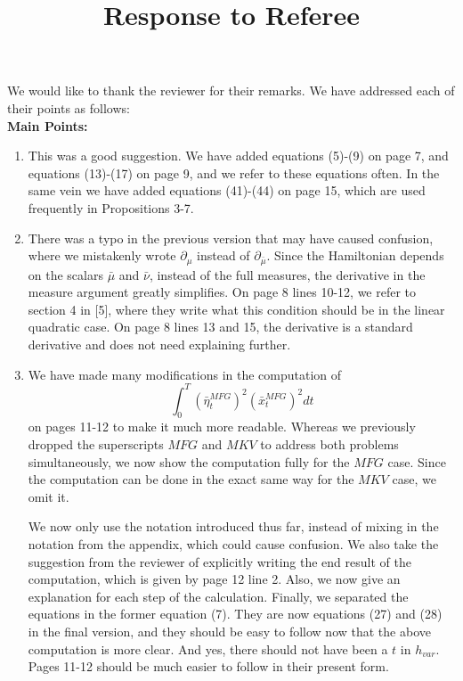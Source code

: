 \documentclass[11pt]{article}
\title{Response to Referee}
\author{}
\begin{document}
\maketitle

We would like to thank the reviewer for their remarks. We have addressed each of their points as follows:\\

\hspace{-7mm} \textbf{Main Points:}
\begin{enumerate}
	\item This was a good suggestion. We have added equations (5)-(9) on page 7, and equations (13)-(17) on page 9, and we refer to these equations often. In the same vein we have added equations (41)-(44) on page 15, which are used frequently in Propositions 3-7.
	\item There was a typo in the previous version that may have caused confusion, where we mistakenly wrote $\partial_{\mu}$ instead of $\partial_{\bar{\mu}}$. Since the Hamiltonian depends on the scalars $\bar{\mu}$ and $\bar{\nu}$, instead of the full measures, the derivative in the measure argument greatly simplifies. On page 8 lines 10-12, we refer to section 4 in [5], where they write what this condition should be in the linear quadratic case. On page 8 lines 13 and 15, the derivative is a standard derivative and does not need explaining further. 
	\item We have made many modifications in the computation of
	 $$\int_0^T (\bar{\eta}^{MFG}_t)^2 (\bar{x}^{MFG}_t)^2dt$$
	  on pages 11-12 to make it much more readable. Whereas we previously dropped the superscripts $MFG$ and $MKV$ to address both problems simultaneously, we now show the computation fully for the $MFG$ case. Since the computation can be done in the exact same way for the $MKV$ case, we omit it.
	  
	  We now only use the notation introduced thus far, instead of mixing in the notation from the appendix, which could cause confusion. We also take the suggestion from the reviewer of explicitly writing the end result of the computation, which is given by page 12 line 2. Also, we now give an explanation for each step of the calculation. Finally, we separated the equations in the former equation (7). They are now equations (27) and (28) in the final version, and they should be easy to follow now that the above computation is more clear. And yes, there should not have been a $t$ in $h_{var}$. Pages 11-12 should be much easier to follow in their present form.
	  

\end{enumerate}
\end{document}
